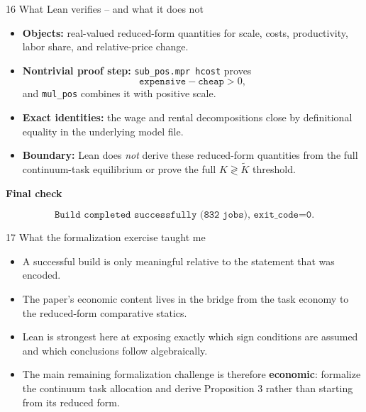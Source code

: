 \documentclass[aspectratio=169,11pt]{beamer}
\begin{document}

\begin{frame}{16 \textperiodcentered{} What Lean verifies -- and what it does not}

  \begin{itemize}\small

    \item \textbf{Objects:}
    real-valued reduced-form quantities for scale, costs,
    productivity, labor share, and relative-price change.

    \item \textbf{Nontrivial proof step:}
    \texttt{sub\_pos.mpr hcost} proves
    \[
      \texttt{expensive}-\texttt{cheap}>0,
    \]
    and \texttt{mul\_pos} combines it with positive scale.

    \item \textbf{Exact identities:}
    the wage and rental decompositions close by definitional
    equality in the underlying model file.

    \item \textbf{Boundary:}
    Lean does \emph{not} derive these reduced-form quantities
    from the full continuum-task equilibrium or prove the full
    $K\gtrless\widetilde K$ threshold.

  \end{itemize}

  \medskip

  \textbf{Final check}

  \[
    \texttt{Build completed successfully (832 jobs), exit\_code=0.}
  \]

\end{frame}


\begin{frame}{17 \textperiodcentered{} What the formalization exercise taught me}

  \begin{itemize}\small

    \item A successful build is only meaningful relative to the
    statement that was encoded.

    \item The paper's economic content lives in the bridge from
    the task economy to the reduced-form comparative statics.

    \item Lean is strongest here at exposing exactly which sign
    conditions are assumed and which conclusions follow algebraically.

    \item The main remaining formalization challenge is therefore
    \textbf{economic}: formalize the continuum task allocation and
    derive Proposition 3 rather than starting from its reduced form.

  \end{itemize}

\end{frame}
\end{document}
